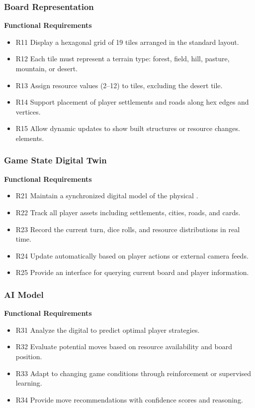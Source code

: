 \documentclass{article}
\begin{document}
\subsubsection{Board Representation}
\label{subsubsec:board-representation}

\textbf{Functional Requirements}

\begin{itemize}
  \item R11 Display a hexagonal grid of 19 tiles arranged in the standard 
  \emph{\Catan{}} layout.
  \item R12 Each tile must represent a terrain type: forest, field, hill, 
  pasture, mountain, or desert.
  \item R13 Assign resource values (2--12) to tiles, excluding the desert tile.
  \item R14 Support placement of player settlements and roads along hex edges
        and vertices.
  \item R15 Allow dynamic updates to show built structures or resource changes.
  elements.
\end{itemize}

\subsubsection{Game State Digital Twin}

\textbf{Functional Requirements}

\begin{itemize}
  \item R21 Maintain a synchronized digital model of the physical \emph{\Catan{}} \GameState{}.
  \item R22 Track all player assets including settlements, cities, roads, and cards.
  \item R23 Record the current turn, dice rolls, and resource distributions in real time.
  \item R24 Update automatically based on player actions or external camera feeds.
  \item R25 Provide an interface for querying current board and player information.
\end{itemize}

\subsubsection{AI Model}

\textbf{Functional Requirements}

\begin{itemize}
  \item R31 Analyze the digital \GameState{} to predict optimal player strategies.
  \item R32 Evaluate potential moves based on resource availability and board position.
  \item R33 Adapt to changing game conditions through reinforcement or supervised learning.
  \item R34 Provide move recommendations with confidence scores and reasoning.
\end{itemize}
\end{document}
